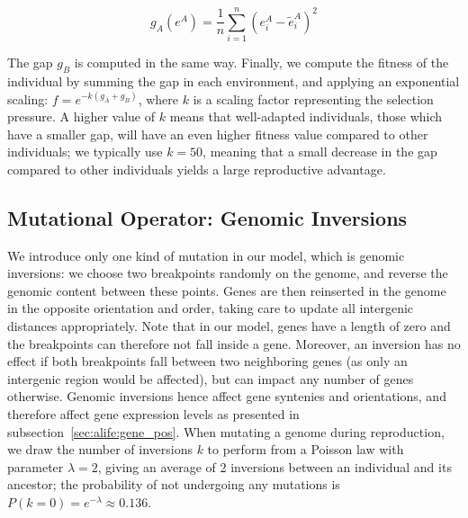 \begin{equation}
g_A(e^A) = \frac{1}{n} \sum_{i=1}^{n} (e^A_i - \tilde{e}^A_i)^2
\label{eq:alife_gap}
\end{equation}

The gap $g_B$ is computed in the same way.
Finally, we compute the fitness of the individual by summing the gap in each environment, and applying an exponential scaling: $f = e^{-k (g_A + g_B)}$, where $k$ is a scaling factor representing the selection pressure.
A higher value of $k$ means that well-adapted individuals, those which have a smaller gap, will have an even higher fitness value compared to other individuals; we typically use $k=50$, meaning that a small decrease in the gap compared to other individuals yields a large reproductive advantage.


\subsection{Mutational Operator: Genomic Inversions}
\label{sec:inversion}

We introduce only one kind of mutation in our model, which is genomic inversions: we choose two breakpoints randomly on the genome, and reverse the genomic content between these points.
Genes are then reinserted in the genome in the opposite orientation and order, taking care to update all intergenic distances appropriately.
Note that in our model, genes have a length of zero and the breakpoints can therefore not fall inside a gene.
Moreover, an inversion has no effect if both breakpoints fall between two neighboring genes (as only an intergenic region would be affected), but can impact any number of genes otherwise.
Genomic inversions hence affect gene syntenies and orientations, and therefore affect gene expression levels as presented in subsection~\ref{sec:alife:gene_pos}.
When mutating a genome during reproduction, we draw the number of inversions $k$ to perform from a Poisson law with parameter $\lambda = 2$, giving an average of 2 inversions between an individual and its ancestor; the probability of not undergoing any mutations is $P(k=0) = e^{-\lambda} \approx 0.136$.

